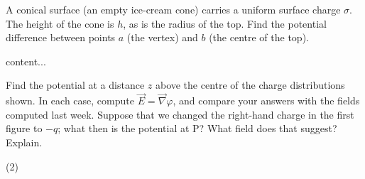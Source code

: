\documentclass[fleqn, a4paper, 10pt, oneside]{scrartcl}
\theoremstyle{definition}
\theoremstyle{theorem}
\begin{document}
\begin{question}
	A conical surface (an empty ice-cream cone) carries a uniform surface charge $\sigma$.
	The height of the cone is $h$, as is the radius of the top.
	Find the potential difference between points $a$ (the vertex) and $b$ (the centre of the top).
\end{question}

\begin{solution}
	content...
\end{solution}

\begin{question}
	Find the potential at a distance $z$ above the centre of the charge distributions shown.
	In each case, compute $\overrightarrow{E} = \overrightarrow{\nabla} \varphi$, and compare your answers with the fields computed last week.
	Suppose that we changed the right-hand charge in the first figure to $-q$; what then is the potential at $\mathrm{P}$?
	What field does that suggest?
	Explain.
	\begin{tasks}(2)
		\task
			\begin{figure}[H]
			\end{figure}
		\task
			\begin{figure}[H]
\end{figure}
\end{tasks}
\end{question}
\end{document}

